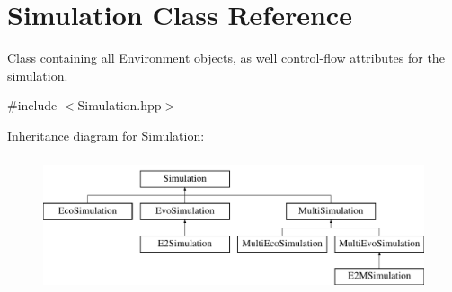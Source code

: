 \hypertarget{classSimulation}{}\section{Simulation Class Reference}
\label{classSimulation}


Class containing all \hyperlink{classEnvironment}{Environment} objects, as well control-\/flow attributes for the simulation.  




{\ttfamily \#include $<$Simulation.\+hpp$>$}

Inheritance diagram for Simulation\+:\begin{figure}[H]
\begin{center}
\leavevmode
\includegraphics[height=4.000000cm]{classSimulation}
\end{center}
\end{figure}
